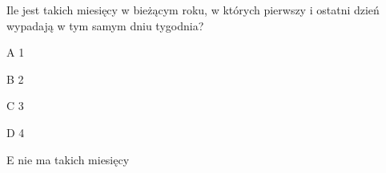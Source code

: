 \begin{tresc}
Ile jest takich miesięcy w bieżącym roku, w których pierwszy i ostatni dzień wypadają w tym samym dniu tygodnia?
\end{tresc}
\begin{wariant}{A} 1 \end{wariant}
\begin{wariant}{B} 2 \end{wariant}
\begin{wariant}{C} 3 \end{wariant}
\begin{wariant}{D} 4 \end{wariant}
\begin{wariant}{E} nie ma takich miesięcy \end{wariant}
